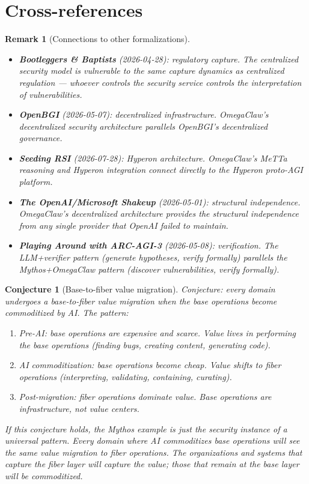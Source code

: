 \documentclass[11pt,a4paper]{article}
\newtheorem{remark}[definition]{Remark}
\newtheorem{conjecture}[definition]{Conjecture}
\begin{document}

\section{Cross-references}

\begin{remark}[Connections to other formalizations]
\begin{itemize}
\item \textbf{Bootleggers \& Baptists} (2026-04-28): regulatory
  capture. The centralized security model is vulnerable to the same
  capture dynamics as centralized regulation --- whoever controls
  the security service controls the interpretation of vulnerabilities.
\item \textbf{OpenBGI} (2026-05-07): decentralized infrastructure.
  OmegaClaw's decentralized security architecture parallels OpenBGI's
  decentralized governance.
\item \textbf{Seeding RSI} (2026-07-28): Hyperon architecture.
  OmegaClaw's MeTTa reasoning and Hyperon integration connect
  directly to the Hyperon proto-AGI platform.
\item \textbf{The OpenAI/Microsoft Shakeup} (2026-05-01): structural
  independence. OmegaClaw's decentralized architecture provides
  the structural independence from any single provider that OpenAI
  failed to maintain.
\item \textbf{Playing Around with ARC-AGI-3} (2026-05-08): verification.
  The LLM+verifier pattern (generate hypotheses, verify formally)
  parallels the Mythos+OmegaClaw pattern (discover vulnerabilities,
  verify formally).
\end{itemize}
\end{remark}

\begin{conjecture}[Base-to-fiber value migration]
Conjecture: every domain undergoes a base-to-fiber value migration
when the base operations become commoditized by AI. The pattern:
\begin{enumerate}
\item Pre-AI: base operations are expensive and scarce. Value lives
  in performing the base operations (finding bugs, creating content,
  generating code).
\item AI commoditization: base operations become cheap. Value shifts
  to fiber operations (interpreting, validating, containing, curating).
\item Post-migration: fiber operations dominate value. Base operations
  are infrastructure, not value centers.
\end{enumerate}

If this conjecture holds, the Mythos example is just the security
instance of a universal pattern. Every domain where AI commoditizes
base operations will see the same value migration to fiber operations.
The organizations and systems that capture the fiber layer will
capture the value; those that remain at the base layer will be
commoditized.
\end{conjecture}
\end{document}
